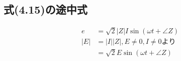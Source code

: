 \subsection{式(4.15)の途中式}
\begin{align*}
	e&=\sqrt{2}|Z|I\sin (\omega t +\angle Z)\\
	|E|&=|I||Z|, E\neq 0, I\neq 0より\\
	&=\sqrt{2}E\sin (\omega t +\angle Z)
\end{align*}